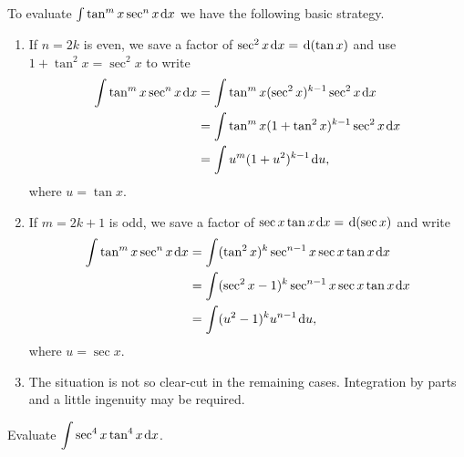 \begin{remark}
To evaluate $\int\tan^m x\sec^n x\mkern 2mu \mathrm{d} x$ we have the following basic strategy.
\begin{enumerate}
\item If $n=2k$ is even, we save a factor of $\sec^2 x\mkern 2mu \mathrm{d} x = \mkern 2mu \mathrm{d}(\tan x)$ and use $1+\tan^2 x = \sec^2 x$ to write
\begin{equation*}
\begin{split}
\int\tan^m x\sec^n x\mkern 2mu \mathrm{d} x &= \int\tan^m x(\sec^2 x)^{k-1}\sec^2 x\mkern 2mu \mathrm{d} x\\
&= \int\tan^m x(1+\tan^2 x)^{k-1}\sec^2 x\mkern 2mu \mathrm{d} x\\
&= \int u^m (1+u^2)^{k-1}\mkern 2mu \mathrm{d} u,
\end{split}
\end{equation*}
where $u=\tan x$.
\item If $m=2k+1$ is odd, we save a factor of $\sec x\tan x\mkern 2mu \mathrm{d} x = \mkern 2mu \mathrm{d}(\sec x)$ and write
\begin{equation*}
\begin{split}
\int\tan^m x\sec^n x\mkern 2mu \mathrm{d} x &= \int (\tan^{2} x)^k\sec^{n-1} x\sec x\tan x\mkern 2mu \mathrm{d} x\\
&= \int (\sec^{2} x -1)^k\sec^{n-1} x\sec x\tan x\mkern 2mu \mathrm{d} x\\
&= \int (u^2 -1)^ku^{n-1} \mkern 2mu \mathrm{d} u,
\end{split}
\end{equation*}
where $u=\sec x$.
\item The situation is not so clear-cut in the remaining cases.
Integration by parts and a little ingenuity may be required.
\end{enumerate}
\end{remark}

\begin{example}
Evaluate $\displaystyle\int\sec^4 x\tan^4 x\mkern 2mu \mathrm{d} x$.
\end{example}
\ifdefined\SOLUTION
{}
\else
\fi
\vfill

